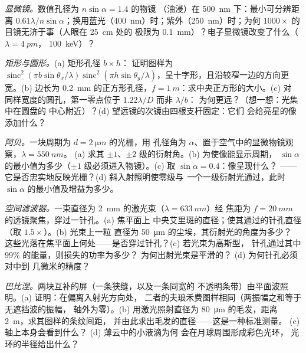 \begin{exercise}[$\star\star$]\label{exo:b2:diffraction:6}
\emph{显微镜。}数值孔径为 $n\sin\alpha = 1.4$ 的物镜
（油浸）在 \qty{500}{nm} 下：最小可分辨距离 $0.61\lambda/n\sin
\alpha$；换用蓝光（\qty{400}{nm}）时；紫外（\qty{250}{nm}）时；为何
$1000\times$ 的目镜无济于事（人眼在 \qty{25}{cm} 处的
极限为 \qty{0.1}{mm}）？电子显微镜改变了什么（$\lambda = \qty{4}{pm}$，
\qty{100}{keV}）？
\end{exercise}

\begin{exercise}[$\star\star$]\label{exo:b2:diffraction:7}
\emph{矩形与圆形。}(a) 矩形孔径 $b \times h$：
证明图样为 $\operatorname{sinc}^2(\pi b\sin\theta_x/\lambda)\operatorname{sinc}^2(\pi h
\sin\theta_y/\lambda)$，呈十字形，且沿较窄一边的方向更宽。(b) 边长为
\qty{0.2}{mm} 的正方形孔径，$f = \qty{1}{m}$：求中央正方形的大小。(c) 对
同样宽度的圆孔，第一零点位于 $1.22\lambda/D$ 而非 $\lambda/b$：
为何更远？（想一想：光集中在圆盘的
中心附近）？(d) 望远镜的次镜由四根支杆固定：它们
会给亮星的像添加什么？
\end{exercise}

\begin{exercise}[$\star\star$]\label{exo:b2:diffraction:8}
\emph{阿贝。}一块周期为 $d = \qty{2}{\micro m}$ 的光栅，用
孔径角为 $\alpha$、置于空气中的显微物镜观察，$\lambda = \qty{550}{nm}$。
(a) 求其 $\pm1$、$\pm2$ 级的衍射角。(b) 为使像能显示周期，
$\sin\alpha$ 的最小值为多少（$\pm1$ 级必须进入物镜）。(c) 取 $\sin\alpha = 0.4$：像呈现什么？
——它是否忠实地反映光栅？(d) 斜入射照明使零级与
\emph{一}个一级衍射光通过，此时
$\sin\alpha$ 的最小值及增益为多少。
\end{exercise}

\begin{exercise}[$\star\star$]\label{exo:b2:diffraction:9}
\emph{空间滤波器。}一束直径为 \qty{2}{mm} 的激光束（$\lambda = \qty{633}{nm}$）经
焦距为 $f = \qty{20}{mm}$ 的透镜聚焦，穿过一针孔。(a) 焦平面上
中央艾里斑的直径；使其通过的针孔直径（取 $1.5\times$）。(b) 光束上一粒
直径为 \qty{50}{\micro m} 的尘埃，其衍射光的角度为多少？
这些光落在焦平面上何处——是否穿过针孔？(c) 若光束为高斯型，
针孔通过其中 $99\%$ 的能量，则损失的功率为多少？
为何出射光束是平滑的？
(d) 为何针孔必须对中到
几微米的精度？
\end{exercise}

\begin{exercise}[$\star\star\star$]\label{exo:b2:diffraction:10}
\emph{巴比涅。}两块互补的屏（一条狭缝，以及一条同宽的
不透明条带）由平面波照明。(a) 证明：在偏离入射光方向处，
二者的夫琅禾费图样相同（两振幅之和等于无遮挡波的振幅，
轴外为零）。(b) 用激光照射直径为
\qty{80}{\micro m} 的毛发，距离 \qty{2}{m}，求其图样的条纹间距，
并由此求出毛发的直径——这是一种标准测量。
(c) 轴上本身会看到什么？
(d) 薄云中的小液滴为何
会在月球周围形成彩色光环，
光环的半径给出什么？
\end{exercise}

